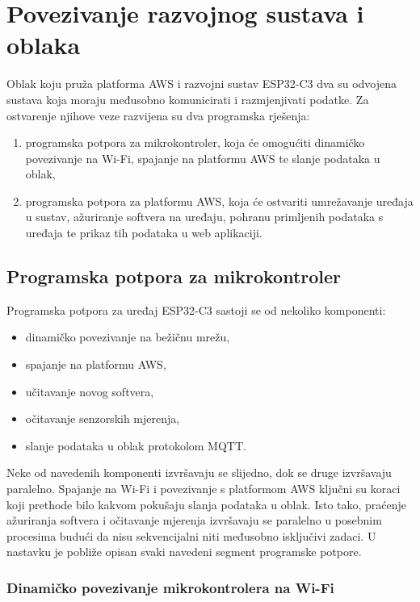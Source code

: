 \chapter{Povezivanje razvojnog sustava i oblaka}

Oblak koju pruža platforma AWS i razvojni sustav ESP32-C3 dva su odvojena sustava koja moraju međusobno komunicirati i razmjenjivati podatke. Za ostvarenje njihove veze razvijena su dva programska rješenja:
\begin{enumerate}
	\item programska potpora za mikrokontroler, koja će omogućiti dinamičko povezivanje na Wi-Fi, spajanje na platformu AWS te slanje podataka u oblak,
	\item programska potpora za platformu AWS, koja će ostvariti umrežavanje uređaja u sustav, ažuriranje softvera na uređaju, pohranu primljenih podataka s uređaja te prikaz tih podataka u web aplikaciji. 
\end{enumerate} 

\section{Programska potpora za mikrokontroler}

Programska potpora za uređaj ESP32-C3 sastoji se od nekoliko komponenti:
\begin{itemize}
	\item dinamičko povezivanje na bežičnu mrežu,
	\item spajanje na platformu AWS,
	\item učitavanje novog softvera, 
	\item očitavanje senzorskih mjerenja, 
	\item slanje podataka u oblak protokolom MQTT.
\end{itemize}

Neke od navedenih komponenti izvršavaju se slijedno, dok se druge izvršavaju paralelno. Spajanje na Wi-Fi i povezivanje s platformom AWS ključni su koraci koji prethode bilo kakvom pokušaju slanja podataka u oblak. Isto tako, praćenje ažuriranja softvera i očitavanje mjerenja izvršavaju se paralelno u posebnim procesima budući da nisu sekvencijalni niti međusobno isključivi zadaci. U nastavku je pobliže opisan svaki navedeni segment programske potpore. 

\subsection{Dinamičko povezivanje mikrokontrolera na Wi-Fi}

